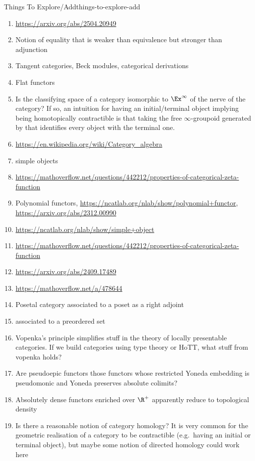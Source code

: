 \begin{remark}{Things To Explore/Add}{things-to-explore-add}
\begin{enumerate}
        \item \url{https://arxiv.org/abs/2504.20949}
        \item Notion of equality that is weaker than equivalence but stronger than adjunction
        \item Tangent categories, Beck modules, categorical derivations
        \item Flat functors
        \item Is the classifying space of a category isomorphic to $\Ex^{\infty}$ of the nerve of the category? If so, an intuition for having an initial/terminal object implying being homotopically contractible is that taking the free $\infty$-groupoid generated by that identifies every object with the terminal one.
        \item \url{https://en.wikipedia.org/wiki/Category_algebra}
        \item simple objects
        \item \url{https://mathoverflow.net/questions/442212/properties-of-categorical-zeta-function}
        \item Polynomial functors, \url{https://ncatlab.org/nlab/show/polynomial+functor}, \url{https://arxiv.org/abs/2312.00990}
        \item \url{https://ncatlab.org/nlab/show/simple+object}
        \item \url{https://mathoverflow.net/questions/442212/properties-of-categorical-zeta-function}
        \item \url{https://arxiv.org/abs/2409.17489}
        \item \url{https://mathoverflow.net/a/478644}
        \item Posetal category associated to a poset as a right adjoint
        \item {} associated to a preordered set
        \item Vopenka's principle simplifies stuff in the theory of locally presentable categories. If we build categories using type theory or HoTT, what stuff from vopenka holds?
        \item Are pseudoepic functors those functors whose restricted Yoneda embedding is pseudomonic and Yoneda preserves absolute colimits?
        \item Absolutely dense functors enriched over $\R^{+}$ apparently reduce to topological density
        \item Is there a reasonable notion of category homology? It is very common for the geometric realisation of a category to be contractible (e.g.\ having an initial or terminal object), but maybe some notion of directed homology could work here

\end{enumerate}
\end{remark}
